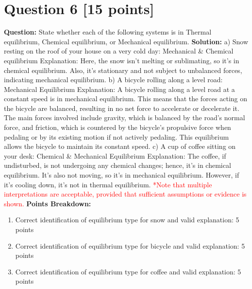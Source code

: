 \documentclass{article}
\begin{document}
\newpage
\section*{Question 6 [15 points]}
\textbf{Question:} State whether each of the following systems is in Thermal equilibrium, Chemical equilibrium, or Mechanical equilibrium.
\newline \newline
\textbf{Solution:}
\newline
a) Snow resting on the roof of your house on a very cold day: Mechanical \& Chemical equilibrium
\newline
Explanation: Here, the snow isn't melting or sublimating, so it's in chemical equilibrium. Also, it's stationary and not subject to unbalanced forces, indicating mechanical equilibrium.
\newline \newline
b) A bicycle rolling along a level road: Mechanical Equilibrium
\newline
Explanation: A bicycle rolling along a level road at a constant speed is in mechanical equilibrium. This means that the forces acting on the bicycle are balanced, resulting in no net force to accelerate or decelerate it. The main forces involved include gravity, which is balanced by the road's normal force, and friction, which is countered by the bicycle's propulsive force when pedaling or by its existing motion if not actively pedaling. This equilibrium allows the bicycle to maintain its constant speed.
\newline \newline
c) A cup of coffee sitting on your desk: Chemical \& Mechanical Equilibrium
\newline
Explanation: The coffee, if undisturbed, is not undergoing any chemical changes; hence, it's in chemical equilibrium. It's also not moving, so it's in mechanical equilibrium. However, if it's cooling down, it's not in thermal equilibrium.
\newline \newline
\textcolor{red}{
*Note that multiple interpretations are acceptable, provided that sufficient assumptions or evidence is shown.
}
\newline \newline
\textbf{Points Breakdown:}
\begin{enumerate}
    \renewcommand{\labelenumi}{\alph{enumi})}
    \item Correct identification of equilibrium type for snow and valid explanation: 5 points
    \item Correct identification of equilibrium type for bicycle and valid explanation: 5 points
    \item Correct identification of equilibrium type for coffee and valid explanation: 5 points
\end{enumerate}
\end{document}
